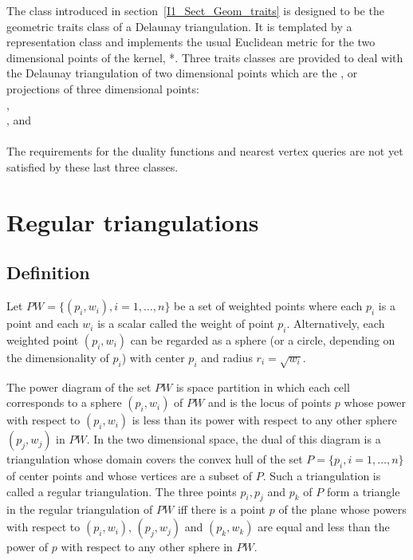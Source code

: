 The class 
introduced in section~\ref{I1_Sect_Geom_traits} is 
 designed to be 
the geometric traits class of a Delaunay triangulation.
It is templated by a representation class and
implements the usual Euclidean metric
for the  two dimensional points of the \cgal kernel,
*.
Three traits classes are provided to deal with
the Delaunay triangulation of two dimensional points which are
the ,  or  projections of three dimensional points:\\
,\\
, and\\
 \\
The requirements for the duality functions and nearest vertex
queries are not yet satisfied by
these last three classes.


\section{Regular triangulations}
\label{I1_Sect_Regular}
 
\subsection{Definition}
Let ${  PW} = \{(p_i, w_i), i = 1, \ldots , n \}$ be a set of 
weighted points where each $p_i$ is a point and each $w_i$
is a scalar called the weight of point $p_i$.
Alternatively, each weighted point $(p_i, w_i)$ can be regarded
as a sphere (or a circle, depending on the dimensionality
of $p_i$)  with center $p_i$ and radius $r_i=\sqrt{w_i}$.

The power diagram of the set ${  PW}$ is space partition in which
 each cell corresponds to a sphere $(p_i, w_i)$ of ${  PW}$
and is the locus of points  $p$ whose power with respect to $(p_i, w_i)$
is less than its power with respect to any other sphere $(p_j, w_j)$
in ${  PW}$. In the two dimensional space,
the dual of this diagram is a triangulation 
whose domain covers the convex hull of the set 
${  P}= \{ p_i, i = 1, \ldots , n \}$ of center points
and whose vertices are a subset of ${  P}$.
Such a triangulation is called a regular triangulation.
The  three points $p_i, p_j$ and $p_k$ of ${  P}$
form a triangle in the regular triangulation of ${  PW}$
iff there is a point $p$ of the plane whose
powers with respect to $(p_i, w_i)$, $(p_j, w_j)$
and $(p_k, w_k)$ are equal and less than the power of $p$
with respect to any other sphere in  ${  PW}$.

